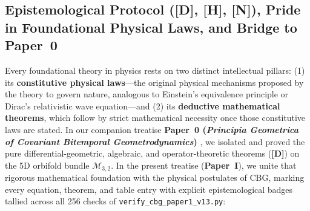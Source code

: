 \documentclass[11pt,a4paper]{article}
\newcommand{\catD}{\textbf{\textcolor{blue!75!black}{[D]}}}
\newcommand{\catH}{\textbf{\textcolor{orange!85!black}{[H]}}}
\newcommand{\catN}{\textbf{\textcolor{teal!75!black}{[N]}}}
\theoremstyle{definition}
\theoremstyle{remark}
\begin{document}
\subsection{\texorpdfstring{Epistemological Protocol (\catD, \catH, \catN), Pride in Foundational Physical Laws, and Bridge to Paper~0}{Epistemological Protocol ([D], [H], [N]), Pride in Foundational Physical Laws, and Bridge to Paper 0}}

Every foundational theory in physics rests on two distinct intellectual pillars: (1) its \textbf{constitutive physical laws}---the original physical mechanisms proposed by the theory to govern nature, analogous to Einstein's equivalence principle or Dirac's relativistic wave equation---and (2) its \textbf{deductive mathematical theorems}, which follow by strict mathematical necessity once those constitutive laws are stated. In our companion treatise \textbf{Paper~0 (\textit{Principia Geometrica of Covariant Bitemporal Geometrodynamics})} \cite{JV_Paper0}, we isolated and proved the pure differential-geometric, algebraic, and operator-theoretic theorems (\catD) on the 5D orbifold bundle $\mathcal{M}_{3,2}$. In the present treatise (\textbf{Paper~I}), we unite that rigorous mathematical foundation with the physical postulates of CBG, marking every equation, theorem, and table entry with explicit epistemological badges tallied across all 256 checks of \texttt{verify\_cbg\_paper1\_v13.py}:
\end{document}
